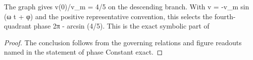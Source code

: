 \begin{lemma}
  \label{lem:physics:phyx-mini-0253:phyxminiproblems-problemphyxmini0253-phaseconstant-exact}
  The graph gives v(0)/v\_m = 4/5 on the descending branch. With v = -v\_m sin (ω t + φ) and the positive representative convention, this selects the fourth-quadrant phase 2π - arcsin (4/5). This is the exact symbolic part of
\end{lemma}
\begin{proof}
  The conclusion follows from the governing relations and figure readouts named in the statement of phase Constant exact.
\end{proof}
